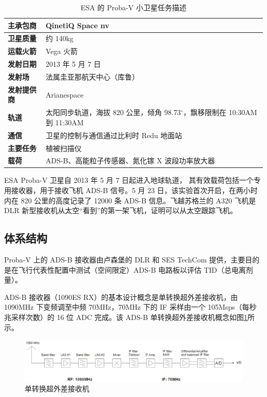 \renewcommand\arraystretch{1.5}
\begin{table}[!htb]
\centering
\caption{ESA 的 Proba-V 小卫星任务描述}
\label{tab:esa_Proba-V_mission}
\begin{tabular}[b]{|p{2.5cm}<{\raggedleft}|p{12cm}<{\raggedright}|}
\hline
\textbf{主承包商} & QinetiQ Space nv \\
\hline
\textbf{卫星质量} & 约 140kg\\
\hline
\textbf{运载火箭 }& Vega 火箭\\
\hline
\textbf{发射日期} & 2013 年 5 月 7 日 \\
\hline
\textbf{发射场} & 法属圭亚那航天中心（库鲁）\\
\hline
\textbf{发射提供商} & Arianespace \\
\hline
\textbf{轨道} & 太阳同步轨道，海拔 820 公里，倾角 98.73$^\circ$，飘移限制在 10:30AM 到 11:30AM  \\
\hline
\textbf{通信} & 卫星的控制与通信通过比利时 Redu 地面站 \\
\hline
\textbf{主要任务} & 植被扫描仪 \\
\hline
\textbf{载荷} & ADS-B、高能粒子传感器、氮化镓 X 波段功率放大器 \\
\hline
\end{tabular}
\end{table}

ESA Proba-V 卫星自 2013 年 5 月 7 日起进入地球轨道， 其有效载荷包括一个专用接收器，用于接收飞机 ADS-B 信号。5 月 23 日，该实验首次开启，在两小时内在 820 公里的高度记录了 12000 条 ADS-B 信息。飞越苏格兰的 A320 飞机是 DLR 新型接收机从太空“看到”的第一架飞机，证明可以从太空跟踪飞机。


\subsection{体系结构}

Proba-V 上的 ADS-B 接收器由卢森堡的 DLR 和 SES TechCom 提供，主要目的是在飞行代表性配置中测试（空间限定）ADS-B 电路板以评估 TID（总电离剂量）。

ADS-B 接收器（1090ES RX）的基本设计概念是单转换超外差接收机，由 1090MHz 下变频调至中频 70MHz，70MHz 下的 IF 采样由一个 105Msps（每秒兆采样次数）的 16 位 ADC 完成。该 ADS-B 单转换超外差接收机概念如图\ref{fig:dlr_ads-b_receiver}所示。

\begin{figure}[!htb]
\centering
\includegraphics[width=15cm]{pic/dlr_ads-b_receiver.png}
\caption{单转换超外差接收机}
\label{fig:dlr_ads-b_receiver}
\end{figure}


